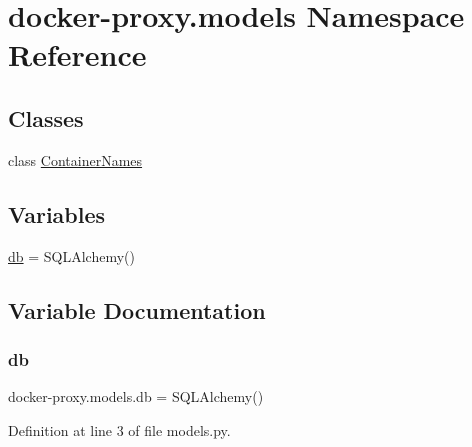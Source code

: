 \hypertarget{namespacedocker-proxy_1_1models}{}\section{docker-\/proxy.models Namespace Reference}
\label{namespacedocker-proxy_1_1models}
\subsection*{Classes}
\begin{DoxyCompactItemize}
\item 
class \hyperlink{classdocker-proxy_1_1models_1_1_container_names}{Container\+Names}
\end{DoxyCompactItemize}
\subsection*{Variables}
\begin{DoxyCompactItemize}
\item 
\hyperlink{namespacedocker-proxy_1_1models_a6d8a79afafa0fb31efaeda3e08b9a31d}{db} = S\+Q\+L\+Alchemy()
\end{DoxyCompactItemize}


\subsection{Variable Documentation}
\hypertarget{namespacedocker-proxy_1_1models_a6d8a79afafa0fb31efaeda3e08b9a31d}{}\label{namespacedocker-proxy_1_1models_a6d8a79afafa0fb31efaeda3e08b9a31d} 
\subsubsection{\texorpdfstring{db}{db}}
{\footnotesize\ttfamily docker-\/proxy.\+models.\+db = S\+Q\+L\+Alchemy()}



Definition at line 3 of file models.\+py.

